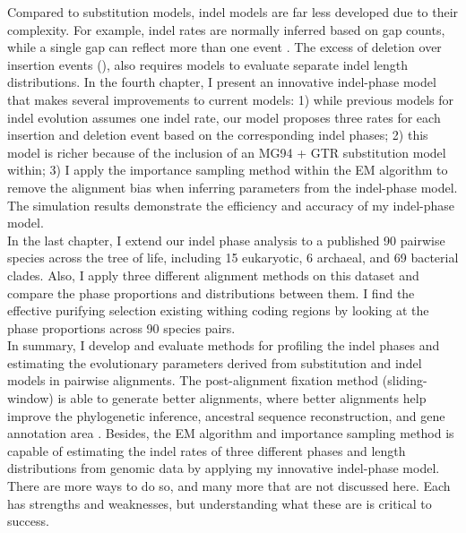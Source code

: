 \indent Compared to substitution models, indel models are far less developed due to their complexity. For example, indel rates are normally inferred based on gap counts, while a single gap can reflect more than one event \parencite{miklos2004long}. The excess of deletion over insertion events (\cite{ophir1997patterns, zhang2003patterns, gu1995size}), also requires models to evaluate separate indel length distributions. In the fourth chapter, I present an innovative indel-phase model that makes several improvements to current models: 1) while previous models for indel evolution assumes one indel rate, our model proposes three rates for each insertion and deletion event based on the corresponding indel phases; 2) this model is richer because of the inclusion of an MG94 + GTR substitution model within; 3) I apply the importance sampling method within the EM algorithm to remove the alignment bias when inferring parameters from the indel-phase model. The simulation results demonstrate the efficiency and accuracy of my indel-phase model. \\
\indent In the last chapter, I extend our indel phase analysis to a published 90 pairwise species across the tree of life, including 15 eukaryotic, 6 archaeal, and 69 bacterial clades. Also, I apply three different alignment methods on this dataset and compare the phase proportions and distributions between them. I find the effective purifying selection existing withing coding regions by looking at the phase proportions across 90 species pairs.  \\
\indent In summary, I develop and evaluate methods for profiling the indel phases and estimating the evolutionary parameters derived from substitution and indel models in pairwise alignments. The post-alignment fixation method (sliding-window) is able to generate better alignments, where better alignments help improve the phylogenetic inference, ancestral sequence reconstruction, and gene annotation area \parencite{rosenberg2009sequence}. Besides, the EM algorithm and importance sampling method is capable of estimating the indel rates of three different phases and length distributions from genomic data by applying my innovative indel-phase model. There are more ways to do so, and many more that are not discussed here. Each has strengths and weaknesses, but understanding what these are is critical to success. 

